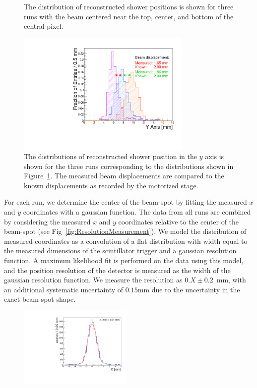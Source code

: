 \documentclass[12pt]{article}
\begin{document}
{\begin{figure}[htbp]
  \caption{The distribution of reconstructed shower positions is shown
    for three runs with the beam centered near the top, center, and bottom of the
    central pixel. }
  \label{fig:EMShowerPositions}
\end{figure}
\begin{figure}[htbp]
  \centering
  \includegraphics[width=0.75\textwidth]{Images/centers/superimposed.pdf}
  \caption{ The distributions of reconstructed shower position in the $y$ axis is
    shown for the three runs corresponding to the distributions shown in
    Figure~\ref{fig:EMShowerPositions}. The measured beam displacements are
    compared to the known displacements as recorded by the motorized stage. }
  \label{fig:EMShowerYPositionComparison}
\end{figure}
For each run, we determine the center of the beam-spot by fitting the
measured $x$ and $y$ coordinates with a gaussian function. The data from all runs are combined by 
considering the measured $x$ and $y$ coordinates relative to the center of the 
beam-spot (see Fig~\ref{fig:ResolutionMeasurement}). We model the distribution of measured coordinates as a convolution of 
a flat distribution with width equal to the measured dimensions of the 
scintillator trigger and a gaussian resolution function. A maximum likelihood fit is performed 
on the data using this model, and the position resolution of the detector is measured as the width 
of the gaussian resolution function. We measure the resolution as 
$0.X\pm0.2$~mm, with an additional systematic uncertainty of $0.15$mm due to the 
uncertainty in the exact beam-spot shape. 
\begin{figure}[htbp]
  \centering
  \includegraphics[width=0.49\textwidth]{Images/XYResolution/X_Resolution_fixedTrigger.pdf}

\end{figure}}
\end{document}
